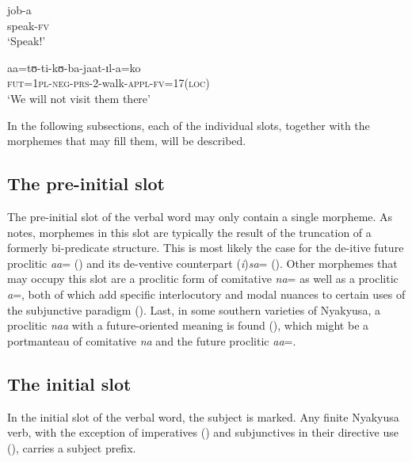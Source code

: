 \begin{exe}
	\ex \label{exImperativeAsMinimalVerb}
	\gll job-a\\
	speak-\textsc{fv}\\
	\glt `Speak!'
	
	\ex
	\label{exMaximalVerb}
	\gll aa=tʊ-ti-kʊ-ba-jaat-ɪl-a=ko\\
	\textsc{fut}=\textsc{1pl}-\textsc{neg}-\textsc{prs}-2-walk-\textsc{appl}-\textsc{fv}=17(\textsc{loc})\\
	\glt `We will not visit them there'
\end{exe}

In the following subsections, each of the individual slots, together with the morphemes that may fill them, will be described.

\subsection{The pre-initial slot}
The pre-initial slot of the verbal word may only contain a single morpheme. As \citet[186]{GueldemannT2003} notes, morphemes in this slot are typically the result of the truncation of a formerly bi-predicate structure. This is most likely the case for the de-itive future proclitic \textit{aa}= () and its de-ventive counterpart (\textit{i})\textit{sa}= (). Other morphemes that may occupy this slot are a proclitic form of comitative \textit{na}= as well as a proclitic \textit{a}=, both of which add specific interlocutory and modal nuances to certain uses of the subjunctive paradigm (). Last, in some southern varieties of Nyakyusa, a proclitic \textit{naa} with a future-oriented meaning is found (), which might be a portmanteau of comitative \textit{na} and the future proclitic \textit{aa}=.

\subsection{The initial slot}
\label{SubjectConcords}
In the initial slot of the verbal word, the subject is marked. Any finite Nyakyusa verb, with the exception of imperatives () and subjunctives in their directive use (), carries a subject prefix. 

